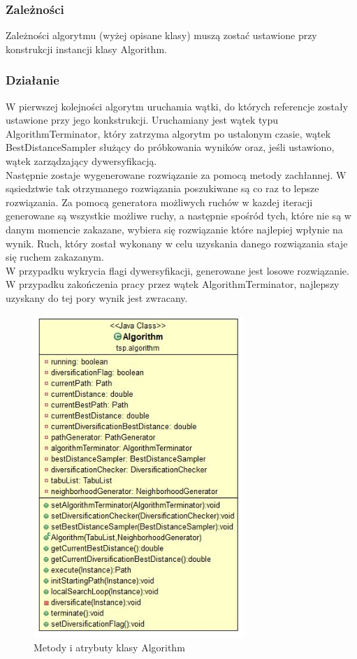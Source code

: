 \documentclass[a4paper,11pt]{article}
\begin{document}
\subsubsection{Zależności}
Zależności algorytmu (wyżej opisane klasy) muszą zostać ustawione przy konstrukcji instancji klasy Algorithm. 
\subsubsection{Działanie}
W pierwszej kolejności algorytm uruchamia wątki, do których referencje zostały ustawione przy jego konkstrukcji. Uruchamiany jest wątek typu AlgorithmTerminator, który zatrzyma algorytm po ustalonym czasie, wątek BestDistanceSampler służący do próbkowania wyników oraz, jeśli ustawiono, wątek zarządzający dywersyfikacją.
\\[0.3cm]Następnie zostaje wygenerowane rozwiązanie za pomocą metody zachłannej. W sąsiedztwie tak otrzymanego rozwiązania poszukiwane są co raz to lepsze rozwiązania. Za pomocą generatora możliwych ruchów w kazdej iteracji generowane są wszystkie możliwe ruchy, a następnie spośród tych, które nie są w danym momencie zakazane, wybiera się rozwiązanie które najlepiej wpłynie na wynik. Ruch, który został wykonany w celu uzyskania danego rozwiązania staje się ruchem zakazanym. 
\\[0.3cm]W przypadku wykrycia flagi dywersyfikacji, generowane jest losowe rozwiązanie. W przypadku zakończenia pracy przez wątek AlgorithmTerminator, najlepszy uzyskany do tej pory wynik jest zwracany.

\begin{figure}[H]
\centering
\includegraphics[width=8cm]{ClassAlgorithm.JPG}
\caption{Metody i atrybuty klasy Algorithm}
\end{figure}
\end{document}
